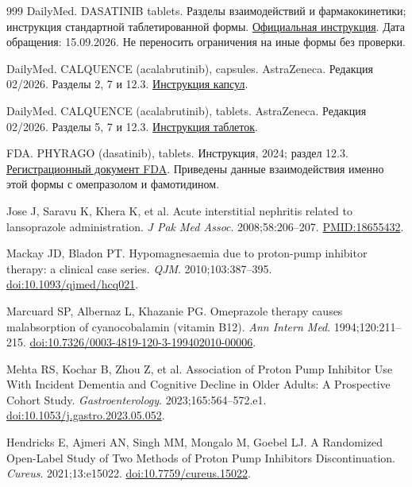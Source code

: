 \documentclass[11pt,a4paper,notitlepage]{report}
\begin{document}
\begin{thebibliography}{999}
 DailyMed. DASATINIB tablets. Разделы взаимодействий и фармакокинетики; инструкция стандартной таблетированной формы. \href{https://dailymed.nlm.nih.gov/dailymed/drugInfo.cfm?setid=f60261dd-b8ea-4511-bed6-ad6d7f4dd828}{Официальная инструкция}. Дата обращения: 15.09.2026. Не переносить ограничения на иные формы без проверки.

 DailyMed. CALQUENCE (acalabrutinib), capsules. AstraZeneca. Редакция 02/2026. Разделы 2, 7 и 12.3. \href{https://dailymed.nlm.nih.gov/dailymed/drugInfo.cfm?setid=dd4835ef-e1bc-4997-a399-1ffa2556fbfe}{Инструкция капсул}.

 DailyMed. CALQUENCE (acalabrutinib), tablets. AstraZeneca. Редакция 02/2026. Разделы 5, 7 и 12.3. \href{https://dailymed.nlm.nih.gov/dailymed/drugInfo.cfm?setid=b1409184-3267-4d8c-8f17-4e01f69828b1}{Инструкция таблеток}.

 FDA. PHYRAGO (dasatinib), tablets. Инструкция, 2024; раздел 12.3. \href{https://www.accessdata.fda.gov/drugsatfda_docs/label/2024/216099s004lbl.pdf}{Регистрационный документ FDA}. Приведены данные взаимодействия именно этой формы с омепразолом и фамотидином.

 Jose J, Saravu K, Khera K, et al. Acute interstitial nephritis related to lansoprazole administration. \textit{J Pak Med Assoc}. 2008;58:206--207. \href{https://pubmed.ncbi.nlm.nih.gov/18655432/}{PMID:18655432}.

 Mackay JD, Bladon PT. Hypomagnesaemia due to proton-pump inhibitor therapy: a clinical case series. \textit{QJM}. 2010;103:387--395. \href{https://doi.org/10.1093/qjmed/hcq021}{doi:10.1093/qjmed/hcq021}.

 Marcuard SP, Albernaz L, Khazanie PG. Omeprazole therapy causes malabsorption of cyanocobalamin (vitamin B12). \textit{Ann Intern Med}. 1994;120:211--215. \href{https://doi.org/10.7326/0003-4819-120-3-199402010-00006}{doi:10.7326/0003-4819-120-3-199402010-00006}.

 Mehta RS, Kochar B, Zhou Z, et al. Association of Proton Pump Inhibitor Use With Incident Dementia and Cognitive Decline in Older Adults: A Prospective Cohort Study. \textit{Gastroenterology}. 2023;165:564--572.e1. \href{https://doi.org/10.1053/j.gastro.2023.05.052}{doi:10.1053/j.gastro.2023.05.052}.

 Hendricks E, Ajmeri AN, Singh MM, Mongalo M, Goebel LJ. A Randomized Open-Label Study of Two Methods of Proton Pump Inhibitors Discontinuation. \textit{Cureus}. 2021;13:e15022. \href{https://doi.org/10.7759/cureus.15022}{doi:10.7759/cureus.15022}.


\end{thebibliography}
\end{document}
